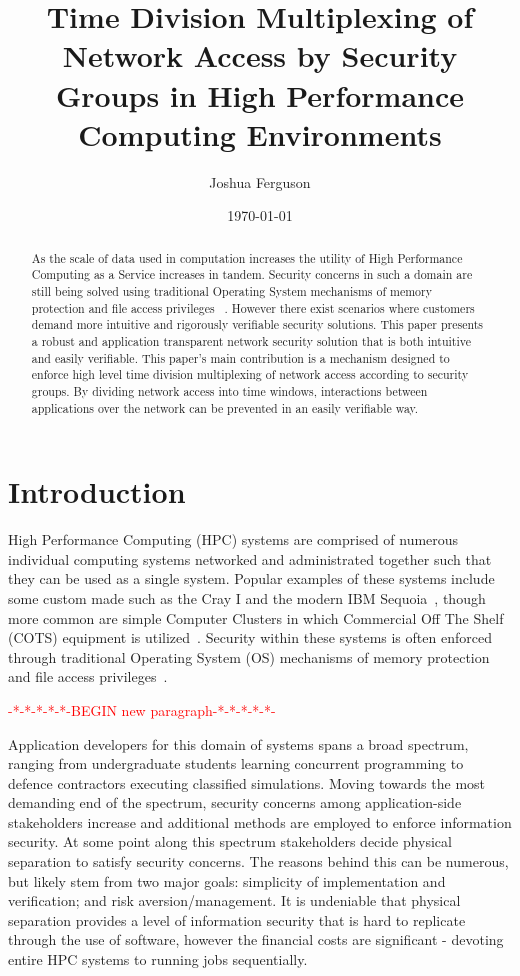 \documentclass{llncs}
\begin{document}
\title{Time Division Multiplexing of Network Access by Security Groups in High Performance Computing Environments}
\author{Joshua Ferguson}
\date{\today}
\maketitle
\begin{abstract}
As the scale of data used in computation increases the utility of High Performance Computing as a Service increases in tandem. Security concerns in such a domain are still being solved using traditional Operating System mechanisms of memory protection and file access privileges ~\cite{buyya1999high}. However there exist scenarios where customers demand more intuitive and rigorously verifiable security solutions. This paper presents a robust and application transparent network security solution that is both intuitive and easily verifiable. This paper's main contribution is a mechanism designed to enforce high level time division multiplexing of network access according to security groups. By dividing network access into time windows, interactions between applications over the network can be prevented in an easily verifiable way. 
\end{abstract}
\section{Introduction}
High Performance Computing (HPC) systems are comprised of numerous individual computing systems networked and administrated together such that they can be used as a single system. Popular examples of these systems include some custom made such as the Cray I and the modern IBM Sequoia~\cite{leavitt2012big}, though more common are simple Computer Clusters in which Commercial Off The Shelf (COTS) equipment is utilized~\cite{buyya1999high}. Security within these systems is often enforced through traditional Operating System (OS) mechanisms of memory protection and file access privileges~\cite{buyya1999high}. 

\textcolor{red}{-*-*-*-*-*-BEGIN new paragraph-*-*-*-*-*-}


Application developers for this domain of systems spans a broad spectrum, ranging from undergraduate students learning concurrent programming to defence contractors executing classified simulations. Moving towards the most demanding end of the spectrum, security concerns among application-side stakeholders increase and additional methods are employed to enforce information security. At some point along this spectrum stakeholders decide physical separation to satisfy security concerns. The reasons behind this can be numerous, but likely stem from two major goals: simplicity of implementation and verification; and risk aversion/management. It is undeniable that physical separation provides a level of information security that is hard to replicate through the use of software, however the financial costs are significant - devoting entire HPC systems to running jobs sequentially. 
\end{document}
